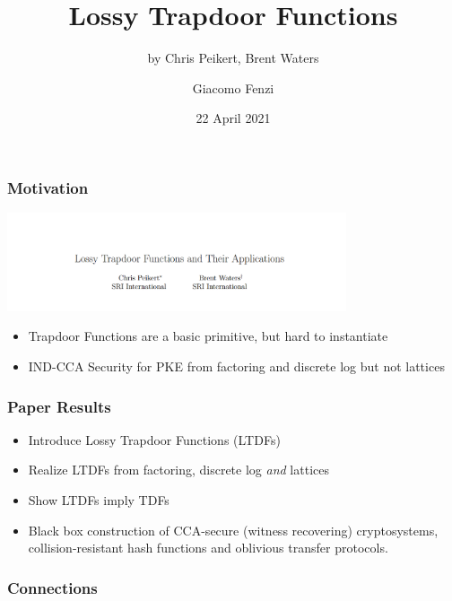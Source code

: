 \documentclass{beamer}
\title{Lossy Trapdoor Functions}
\subtitle{by Chris Peikert, Brent Waters}
\author{Giacomo Fenzi}
\institute{ETH Zurich}
\date{22 April 2021}
\begin{document}
\frame{\titlepage}

\begin{frame}
    \frametitle{Motivation}
    \begin{center}
        \includegraphics[width=10cm]{intro.PNG}
    \end{center}
    \begin{itemize}
        \item Trapdoor Functions are a basic primitive, but hard to instantiate
        \item IND-CCA Security for PKE from factoring and discrete log but not lattices
    \end{itemize}


\end{frame}


\begin{frame}
    \frametitle{Paper Results}
    \begin{itemize}
        \item Introduce Lossy Trapdoor Functions (LTDFs)
        \item Realize LTDFs from factoring, discrete log \textit{and} lattices
        \item Show LTDFs imply TDFs
        \item Black box construction of CCA-secure (witness recovering) cryptosystems,
              collision-resistant hash functions and oblivious transfer protocols.
    \end{itemize}
\end{frame}

\begin{frame}
    \frametitle{Connections}
    \begin{center}
    \end{center}
\end{frame}
\end{document}
